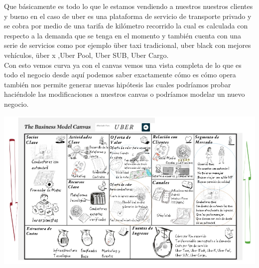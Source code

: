\documentclass[10pt,a4paper]{article}
\begin{document}
\begin{multicols}{2}
\begin{enumerate}[a.]
			Que básicamente es todo lo que le estamos vendiendo a nuestros nuestros clientes y bueno en el caso de uber es una plataforma de servicio de transporte privado y se cobra por medio de una tarifa de kilómetro recorrido la cual es calculada con respecto a la demanda que se tenga en el momento y también cuenta con una serie de servicios como por ejemplo über taxi tradicional, uber black con mejores vehículos, über x ,Uber Pool, Uber SUB, Uber Cargo.\\
			
			Con esto vemos curva ya con el canvas vemos una vista completa de lo que es todo el negocio desde aquí podemos saber exactamente cómo es cómo opera también nos permite generar nuevas hipótesis las cuales podríamos probar haciéndole las modificaciones a nuestros canvas o podríamos modelar un nuevo negocio.
			
			\begin{center}
				\includegraphics[scale=0.38]{./Imagenes/img13}
			\end{center}
						
		\end{enumerate}
		
		
				
	
		\end{multicols}	
			
\end{document}
